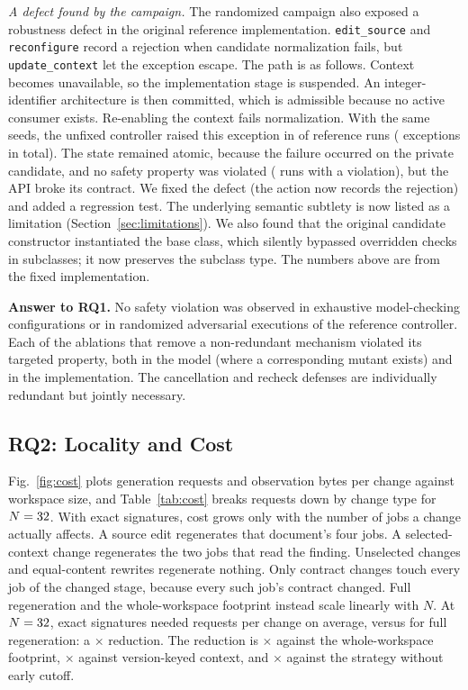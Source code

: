 \documentclass[10pt,journal,compsoc]{IEEEtran}
\theoremstyle{plain}
\theoremstyle{definition}
\begin{document}
\emph{A defect found by the campaign.} The randomized campaign also exposed a robustness defect in the original reference implementation. \texttt{edit\_source} and \texttt{reconfigure} record a rejection when candidate normalization fails, but \texttt{update\_context} let the exception escape. The path is as follows. Context becomes unavailable, so the implementation stage is suspended. An integer-identifier architecture is then committed, which is admissible because no active consumer exists. Re-enabling the context fails normalization. With the same seeds, the unfixed controller raised this exception in \PreFixApiRuns{} of \PreFixRuns{} reference runs (\PreFixApiExceptions{} exceptions in total). The state remained atomic, because the failure occurred on the private candidate, and no safety property was violated (\PreFixViolRuns{} runs with a violation), but the API broke its contract. We fixed the defect (the action now records the rejection) and added a regression test. The underlying semantic subtlety is now listed as a limitation (Section~\ref{sec:limitations}). We also found that the original candidate constructor instantiated the base class, which silently bypassed overridden checks in subclasses; it now preserves the subclass type. The numbers above are from the fixed implementation.

\textbf{Answer to RQ1.} No safety violation was observed in \TLCBaselines{} exhaustive model-checking configurations or in \AblRuns{} randomized adversarial executions of the reference controller. Each of the \AblDetected{} ablations that remove a non-redundant mechanism violated its targeted property, both in the model (where a corresponding mutant exists) and in the implementation. The cancellation and recheck defenses are individually redundant but jointly necessary.

\subsection{RQ2: Locality and Cost}\label{sec:rq2}
Fig.~\ref{fig:cost} plots generation requests and observation bytes per change against workspace size, and Table~\ref{tab:cost} breaks requests down by change type for $N=32$. With exact signatures, cost grows only with the number of jobs a change actually affects. A source edit regenerates that document's four jobs. A selected-context change regenerates the two jobs that read the finding. Unselected changes and equal-content rewrites regenerate nothing. Only contract changes touch every job of the changed stage, because every such job's contract changed. Full regeneration and the whole-workspace footprint instead scale linearly with $N$. At $N=32$, exact signatures needed \ExactReqMaxN{} requests per change on average, versus \FullReqMaxN{} for full regeneration: a \RatioFull$\times$ reduction. The reduction is \RatioWorkspace$\times$ against the whole-workspace footprint, \RatioVersion$\times$ against version-keyed context, and \RatioCutoff$\times$ against the strategy without early cutoff.
\end{document}

